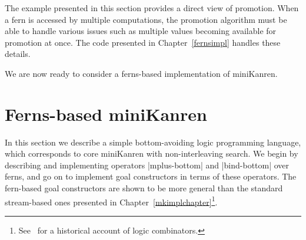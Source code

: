 
The example presented in this section provides a direct view of
promotion. When a fern is accessed by multiple computations, the
promotion algorithm must be able to handle various issues such as
multiple values becoming available for promotion at once. The code
presented in Chapter~\ref{fernsimpl} handles these details.

We are now ready to consider a ferns-based implementation of
miniKanren.

\section{Ferns-based miniKanren}\label{lp-system}

In this section we describe a simple bottom-avoiding logic programming
language, which corresponds to core miniKanren with non-interleaving
search.
We begin by describing and
implementing operators \scheme|mplus-bottom| and \scheme|bind-bottom| over ferns,
and go on to implement goal constructors in terms of these
operators.  The fern-based goal constructors are shown to be more
general than the standard stream-based ones presented in Chapter~\ref{mkimplchapter}\footnote{See~\citet{Wand04relatingmodels} for a historical account of logic combinators.}.

